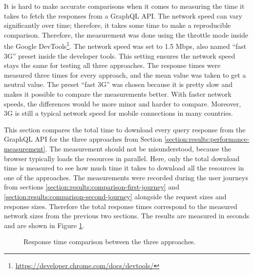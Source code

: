 It is hard to make accurate comparisons when it comes to measuring the time it takes to fetch the responses from a GraphQL \ac{API}. The network speed can vary significantly over time; therefore, it takes some time to make a reproducible comparison. Therefore, the measurement was done using the throttle mode inside the Google DevTools\footnote{\url{https://developer.chrome.com/docs/devtools/}}. The network speed was set to 1.5 Mbps, also named \enquote{fast 3G} preset inside the developer tools. This setting ensures the network speed stays the same for testing all three approaches. The response times were measured three times for every approach, and the mean value was taken to get a neutral value. The preset \enquote{fast 3G} was chosen because it is pretty slow and makes it possible to compare the measurements better. With faster network speeds, the differences would be more minor and harder to compare. Moreover, 3G is still a typical network speed for mobile connections in many countries.

\bigskip

\noindent This section compares the total time to download every query response from the GraphQL \ac{API} for the three approaches from Section \ref{section:results:performance-measurement}. The measurement should not be misunderstood, because the browser typically loads the resources in parallel. Here, only the total download time is measured to see how much time it takes to download all the resources in one of the approaches. The measurements were recorded during the user journeys from sections \ref{section:results:comparison-first-journey} and \ref{section:results:comparison-second-journey} alongside the request sizes and response sizes. Therefore the total response times correspond to the measured network sizes from the previous two sections. The results are measured in seconds and are shown in Figure \ref{fig:discussion:response-times}. 

\ifshowImages
\begin{figure}[H]
  \centering
  \caption{Response time comparison between the three approaches.}\label{fig:discussion:response-times}
\end{figure}
\fi

